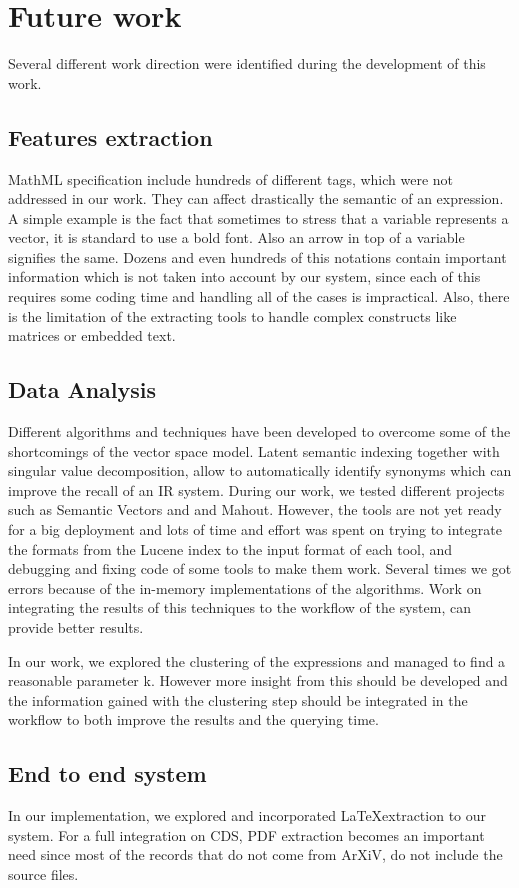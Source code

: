 \chapter{Future work}
\label{chap-future_work}

Several different work direction were identified during the development of this work. 

\section{Features extraction}
MathML specification include hundreds of different tags, which were not addressed in our work. They can affect drastically the semantic of an expression. A simple example is the fact that sometimes to stress that a variable represents a vector, it is standard to use a bold font. Also an arrow in top of a variable signifies the same. Dozens and even hundreds of this notations contain important information which is not taken into account by our system, since each of this requires some coding time and handling all of the cases is impractical. Also, there is the limitation of the extracting tools to handle complex constructs like matrices or embedded text.

\section{Data Analysis}
Different algorithms and techniques have been developed to overcome some of the shortcomings of the vector space model. Latent semantic indexing together with singular value decomposition, allow to automatically identify synonyms which can improve the recall of an IR system. During our work, we tested different projects such as Semantic Vectors\cite{semantic_vectors} and \cite{mallet} and Mahout. However, the tools are not yet ready for a big deployment and lots of time and effort was spent on trying to integrate the formats from the Lucene index to the input format of each tool, and debugging and fixing code of some tools to make them work. Several times we got errors because of the in-memory implementations of the algorithms. Work on integrating the results of this techniques to the workflow of the system, can provide better results. 

In our work, we explored the clustering of the expressions and managed to find a reasonable parameter k. However more insight from this should be developed and the information gained with the clustering step should be integrated in the workflow to both improve the results and the querying time. 

\section{End to end system}
In our implementation, we explored and incorporated \LaTeX extraction to our system. For a full integration on CDS, PDF extraction becomes an important need since most of the records that do not come from ArXiV, do not include the source files.